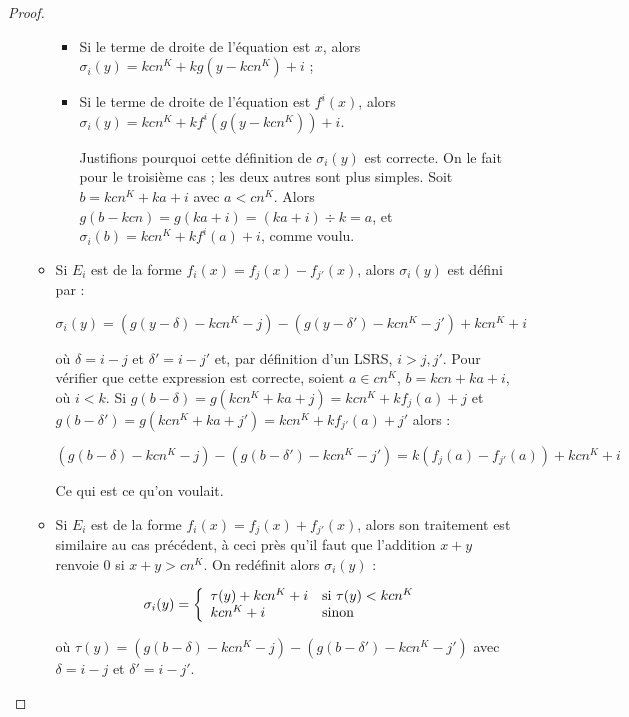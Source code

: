 \begin{proof}
\begin{enumerate}[itemsep=-1mm,leftmargin=2cm]
\begin{itemize}[itemsep=-1mm, leftmargin=1cm]
\begin{itemize}[itemsep=-1mm,leftmargin=1cm]
								\item %
								Si le terme de droite de l'équation est $x$, alors $\sigma_i(y) = kcn^K + kg\left( y - kcn^K \right) + i$ ;
								
								\item %
								Si le terme de droite de l'équation est $f^i(x)$, alors $\sigma_i(y) = kcn^K + k f^i\left( g\left( y - kcn^K \right) \right) + i$.
								
								Justifions pourquoi cette définition de $\sigma_i(y)$ est correcte. On le fait pour le troisième cas ; les deux autres sont plus simples. Soit $b = kcn^K + ka + i$ avec $a < cn^K$. Alors $g(b-kcn) = g(ka + i) = (ka + i) \div k = a$, et $\sigma_i(b) = kcn^K + kf^i(a) + i$, comme voulu. 
							\end{itemize}
							
			
						\item
							Si $E_i$ est de la forme $f_i(x) = f_j(x) - f_{j'}(x)$, alors $\sigma_i(y)$ est défini par :
							
							\[
								\sigma_i(y) = \left( g(y - \delta) - k cn^K - j \right) - \left( g(y - \delta') - k cn^K - j' \right) + kcn^K + i
							\]
							
							où $\delta = i -j$ et $\delta' = i - j'$ et, par définition d'un LSRS, $i > j, j'$. Pour vérifier que cette expression est correcte, soient $a \in cn^K$, $b = kcn + ka + i$, où $i<k$. Si $g(b - \delta) = g(kcn^K + ka + j) = kcn^K + kf_j(a) + j$ et $g(b - \delta') = g(kcn^K + ka + j') = kcn^K + kf_{j'}(a) + j'$ alors :
							
							\[
								\left( g\left( b - \delta \right) - kcn^K - j \right) - \left( g\left( b - \delta' \right) - kcn^K - j' \right)
								=  k \left( f_{j}(a) - f_{j'}(a) \right) + kcn^K + i
							\]

							
							Ce qui est ce qu'on voulait.
							
						\item
							Si $E_i$ est de la forme $f_i(x) = f_j(x) + f_{j'}(x)$, alors son traitement est similaire au cas précédent, à ceci près qu'il faut que l'addition $x + y$ renvoie $0$ si $x + y > cn^K$. On redéfinit alors $\sigma_i(y)$ : 
							
							\[
								\sigma_i(y) = \left\lbrace \begin{array}{ll} 
									\tau(y) + kcn^K + i & \text{si $\tau(y) < kcn^K$} \\
									kcn^K + i & \text{sinon}
									 \end{array} \right.
							\]
							
							où $\tau(y) = \left( g\left( b - \delta \right) - kcn^K - j \right) - \left( g\left( b - \delta' \right) - kcn^K - j' \right)$ avec $\delta = i - j$ et $\delta' = i - j'$. 
							

\end{itemize}
\end{enumerate}
\end{proof}
